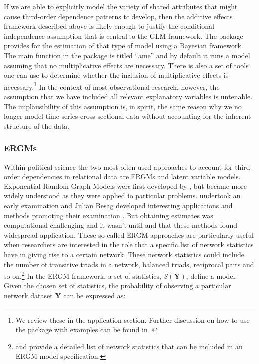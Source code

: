 If we are able to explicitly model the variety of shared attributes that might cause third-order dependence patterns to develop, then the additive effects framework described above is likely enough to justify the conditional independence assumption that is central to the GLM framework. The  package provides for the estimation of that type of model using a Bayesian framework. The main function in the  package is titled ``ame'' and by default it runs a model assuming that no multiplicative effects are necessary. There is also a set of tools one can use to determine whether the inclusion of multiplicative effects is necessary.\footnote{We review these in the application section. Further discussion on how to use the  package with examples can be found in \citet{hoff:2015:arxiv}.} In the context of most observational research, however, the assumption that we have included all relevant explanatory variables is untenable. The implausibility of this assumption is, in spirit, the same reason why we no longer model time-series cross-sectional data without accounting for the inherent structure of the data.

\subsubsection{\textbf{ERGMs}}

Within political science the two most often used approaches to account for third-order dependencies in relational data are ERGMs and latent variable models. Exponential Random Graph Models were first developed by \citet{erdos:renyi:1959}, but became more widely understood as they were applied to particular problems.  \citet{frank:1971} undertook an early examination and Julian Besag developed interesting applications and methods promoting their examination \citep{besag:1977b}. But obtaining estimates was computational challenging and it wasn't until \citet{frank:strauss:1986} and \citet{wasserman:pattison:1996} that these methods found widespread application. These so-called ERGM approaches are particularly useful when researchers are interested in the role that a specific list of network statistics have in giving rise to a certain network. These network statistics could include the number of transitive triads in a network, balanced triads, reciprocal pairs and so on.\footnote{\citet{morris:etal:2008} and \citet{snijders:etal:2006} provide a detailed list of network statistics that can be included in an ERGM model specification.} In the ERGM framework, a set of statistics, $S(\mathbf{Y})$, define a model. Given the chosen set of statistics, the probability of observing a particular network dataset $\mathbf{Y}$ can be expressed as:

